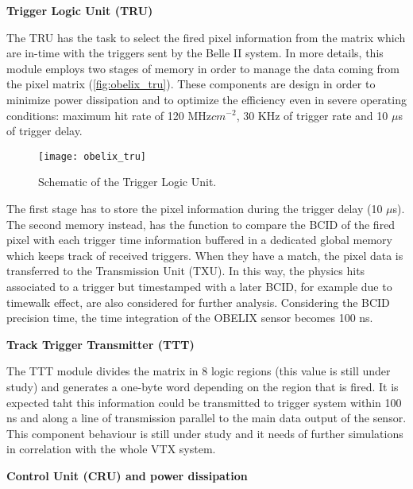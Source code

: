 \begin{description}
\item \textbf{Trigger Logic Unit (TRU)}
\end{description}

The TRU has the task to select the fired pixel information from the matrix which are in-time with the triggers sent by the Belle II system. In more details, this module employs two stages of memory in order to manage the data coming from the pixel matrix (\autoref{fig:obelix_tru}). These components are design in order to minimize power dissipation and to optimize the efficiency even in severe operating conditions: maximum hit rate of 120 MHz$cm^{-2}$, 30 KHz of trigger rate and 10 $\mu$s of trigger delay.

\begin{figure}[h!]
\centering
\texttt{[image: obelix\_tru]}
\caption{Schematic of the Trigger Logic Unit.}
\label{fig:obelix_tru}
\end{figure}

The first stage has to store the pixel information during the trigger delay (10 $\mu$s). The second memory instead, has the function to compare the BCID of the fired pixel with each trigger time information buffered in a dedicated global memory which keeps track of received triggers. When they have a match, the pixel data is transferred to the Transmission Unit (TXU). In this way, the physics hits associated to a trigger but timestamped with a later BCID, for example due to timewalk effect, are also considered for further analysis.
Considering the BCID precision time, the time integration of the OBELIX sensor becomes 100 ns.


\begin{description}
\item \textbf{Track Trigger Transmitter (TTT)}
\end{description}

The TTT module divides the matrix in 8 logic regions (this value is still under study) and generates a one-byte word depending on the region that is fired. It is expected taht this information could be transmitted to trigger system within 100 ns and along a line of transmission parallel to the main data output of the sensor. 
This component behaviour is still under study and it needs of further simulations in correlation with the whole VTX system.


\begin{description}
\item \textbf{Control Unit (CRU) and power dissipation}
\end{description}

